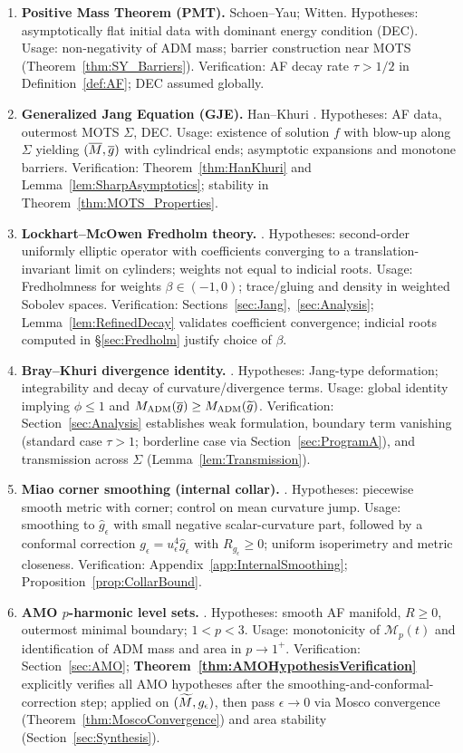 \begin{enumerate}[(D1)]
    \item \textbf{Positive Mass Theorem (PMT).} Schoen--Yau; Witten. Hypotheses: asymptotically flat initial data with dominant energy condition (DEC). Usage: non-negativity of ADM mass; barrier construction near MOTS (Theorem~\ref{thm:SY_Barriers}). Verification: AF decay rate $\tau>1/2$ in Definition~\ref{def:AF}; DEC assumed globally.
    \item \textbf{Generalized Jang Equation (GJE).} Han--Khuri \cite{hankhuri2013}. Hypotheses: AF data, outermost MOTS $\Sigma$, DEC. Usage: existence of solution $f$ with blow-up along $\Sigma$ yielding $(\overline{M},\overline{g})$ with cylindrical ends; asymptotic expansions and monotone barriers. Verification: Theorem~\ref{thm:HanKhuri} and Lemma~\ref{lem:SharpAsymptotics}; stability in Theorem~\ref{thm:MOTS_Properties}.
    \item \textbf{Lockhart--McOwen Fredholm theory.} \cite{lockhartmccowen1985}. Hypotheses: second-order uniformly elliptic operator with coefficients converging to a translation-invariant limit on cylinders; weights not equal to indicial roots. Usage: Fredholmness for weights $\beta\in(-1,0)$; trace/gluing and density in weighted Sobolev spaces. Verification: Sections~\ref{sec:Jang},~\ref{sec:Analysis}; Lemma~\ref{lem:RefinedDecay} validates coefficient convergence; indicial roots computed in \S\ref{sec:Fredholm} justify choice of $\beta$.
    \item \textbf{Bray--Khuri divergence identity.} \cite{braykhuri2010}. Hypotheses: Jang-type deformation; integrability and decay of curvature/divergence terms. Usage: global identity implying $\phi\le 1$ and $M_{\rm ADM}(\overline{g})\ge M_{\rm ADM}(\widetilde{g})$. Verification: Section~\ref{sec:Analysis} establishes weak formulation, boundary term vanishing (standard case $\tau>1$; borderline case via Section~\ref{sec:ProgramA}), and transmission across $\Sigma$ (Lemma~\ref{lem:Transmission}).
    \item \textbf{Miao corner smoothing (internal collar).} \cite{miao2002}. Hypotheses: piecewise smooth metric with corner; control on mean curvature jump. Usage: smoothing to $\hat g_\epsilon$ with small negative scalar-curvature part, followed by a conformal correction $g_\epsilon=u_\epsilon^4\hat g_\epsilon$ with $R_{g_\epsilon}\ge0$; uniform isoperimetry and metric closeness. Verification: Appendix~\ref{app:InternalSmoothing}; Proposition~\ref{prop:CollarBound}.
    \item \textbf{AMO $p$-harmonic level sets.} \cite{amo2024}. Hypotheses: smooth AF manifold, $R\ge 0$, outermost minimal boundary; $1<p<3$. Usage: monotonicity of $\mathcal{M}_p(t)$ and identification of ADM mass and area in $p\to1^+$. Verification: Section~\ref{sec:AMO}; \textbf{Theorem~\ref{thm:AMOHypothesisVerification}} explicitly verifies all AMO hypotheses after the smoothing-and-conformal-correction step; applied on $(\widetilde{M},g_\epsilon)$, then pass $\epsilon\to 0$ via Mosco convergence (Theorem~\ref{thm:MoscoConvergence}) and area stability (Section~\ref{sec:Synthesis}).

\end{enumerate}
